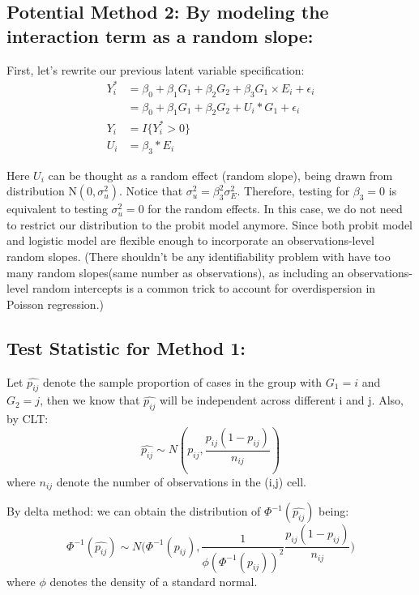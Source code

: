 \documentclass[]{article}
\begin{document}
\hypertarget{potential-method-2-by-modeling-the-interaction-term-as-a-random-slope}{%
\subsection{Potential Method 2: By modeling the interaction term as a
random
slope:}\label{potential-method-2-by-modeling-the-interaction-term-as-a-random-slope}}

First, let's rewrite our previous latent variable specification:
\begin{equation}\label{eqn:latentformulationRandomSlope}
\begin{aligned}
Y_i^* &= \beta_0 + \beta_1 G_1 + \beta_2 G_2 + \beta_3 G_1 \times E_i + \epsilon_i \\
      &= \beta_0 + \beta_1 G_1 + \beta_2 G_2 + U_i * G_1 + \epsilon_i \\
Y_i &= I\{Y_i^*>0\} \\
U_i &= \beta_3 * E_i
\end{aligned}
\end{equation}

Here \(U_i\) can be thought as a random effect (random slope), being
drawn from distribution \(\text{N}(0,\sigma_u^2)\). Notice that
\(\sigma_u^2 = \beta_3^2\sigma_E^2\). Therefore, testing for
\(\beta_3 =0\) is equivalent to testing \(\sigma_u^2 = 0\) for the
random effects. In this case, we do not need to restrict our
distribution to the probit model anymore. Since both probit model and
logistic model are flexible enough to incorporate an observations-level
random slopes. (There shouldn't be any identifiability problem with have
too many random slopes(same number as observations), as including an
observations-level random intercepts is a common trick to account for
overdispersion in Poisson regression.)

\hypertarget{test-statistic-for-method-1}{%
\subsection{Test Statistic for Method
1:}\label{test-statistic-for-method-1}}

Let \(\hat{p_{ij}}\) denote the sample proportion of cases in the group
with \(G_1 = i\) and \(G_2 = j\), then we know that \(\hat{p_{ij}}\)
will be independent across different i and j. Also, by CLT:
\[\hat{p_{ij}} \sim N(p_{ij},\frac{p_{ij}(1-p_{ij})}{n_{ij}})\] where
\(n_{ij}\) denote the number of observations in the (i,j) cell.

By delta method: we can obtain the distribution of
\(\Phi^{-1}(\hat{p_{ij}})\) being:
\[\Phi^{-1}(\hat{p_{ij}}) \sim N\bigg(\Phi^{-1}(p_{ij}),\frac{1}{\phi(\Phi^{-1}(p_{ij}))^2}\frac{p_{ij}(1-p_{ij})}{n_{ij}}\bigg)\]
where \(\phi\) denotes the density of a standard normal.
\end{document}
